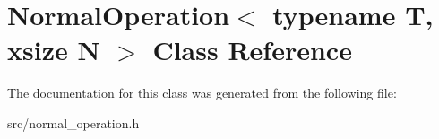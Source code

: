 \hypertarget{class_normal_operation_3_01typename_01_t_00_01xsize_01_n_01_4}{\section{Normal\-Operation$<$ typename T, xsize N $>$ Class Reference}
\label{class_normal_operation_3_01typename_01_t_00_01xsize_01_n_01_4}
}


The documentation for this class was generated from the following file\-:\begin{DoxyCompactItemize}
\item 
src/normal\-\_\-operation.\-h\end{DoxyCompactItemize}
